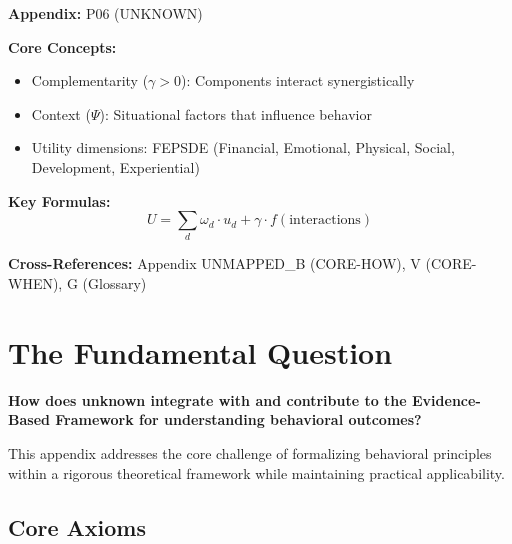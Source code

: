 \begin{tcolorbox}[colback=blue!5!white, colframe=blue!75!black,
    title=Quick Reference: Unknown]

\textbf{Appendix:} P06 (UNKNOWN)

\textbf{Core Concepts:}
\begin{itemize}[nosep]
\item Complementarity ($\gamma > 0$): Components interact synergistically
\item Context ($\Psi$): Situational factors that influence behavior
\item Utility dimensions: FEPSDE (Financial, Emotional, Physical, Social, Development, Experiential)
\end{itemize}

\textbf{Key Formulas:}
\begin{equation}
U = \sum_d \omega_d \cdot u_d + \gamma \cdot f(\text{interactions})
\end{equation}

\textbf{Cross-References:} Appendix UNMAPPED_B (CORE-HOW), V (CORE-WHEN), G (Glossary)
\end{tcolorbox}

\section{The Fundamental Question}
\label{sec:p06-fundamental}

\begin{tcolorbox}[
    colback=red!5!white,
    colframe=red!75!black,
    title={\textbf{Fundamental Question}}
]
\textbf{How does unknown integrate with and contribute to the
Evidence-Based Framework for understanding behavioral outcomes?}

This appendix addresses the core challenge of formalizing behavioral principles
within a rigorous theoretical framework while maintaining practical applicability.
\end{tcolorbox}


\subsection{Core Axioms}
\label{sec:p06-axioms}

